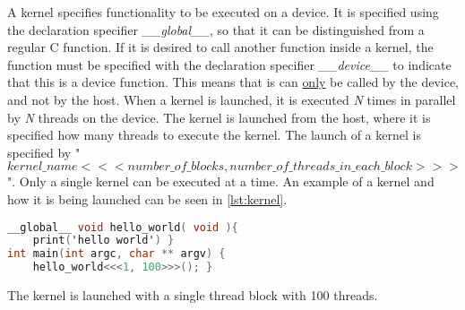 A kernel specifies functionality to be executed on a device.
It is specified using the declaration specifier \textit{\_\_global\_\_}, so that it can be distinguished from a regular C function.
If it is desired to call another function inside a kernel, the function must be specified with the declaration specifier \textit{\_\_device\_\_} to indicate that this is a device function.
This means that is can \underline{only} be called by the device, and not by the host.
When a kernel is launched, it is executed \textit{N} times in parallel by \textit{N} threads on the device.
The kernel is launched from the host, where it is specified how many \cuda{} threads to execute the kernel.
The launch of a kernel is specified by "$kernel\_name<<< number\_of\_blocks, number\_of\_threads\_in\_each\_block >>>$".
Only a single kernel can be executed at a time.
An example of a kernel and how it is being launched can be seen in \autoref{lst:kernel}.
\begin{lstlisting}[language=C,caption={Kernel example},label=lst:kernel]
__global__ void hello_world( void ){
	print('hello world') }
int main(int argc, char ** argv) {
	hello_world<<<1, 100>>>(); }
\end{lstlisting}
The kernel is launched with a single thread block with 100 threads.